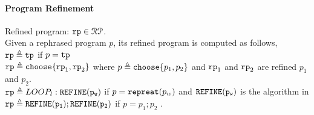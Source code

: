 \paragraph*{Program Refinement} 
Refined program:
$\mathtt{rp} \in \mathcal{RP}$.
\\
Given a rephrased program $p$, its refined program is computed as follows,
\\
$\mathtt{rp} \triangleq \mathtt{tp} $ if $p = \mathtt{tp}$\\
$\mathtt{rp} \triangleq \mathtt{choose}\{\mathtt{rp}_1, \mathtt{rp}_2 \}$ where $p \triangleq \mathtt{choose}\{p_1, p_2 \}$ and 
  $\mathtt{rp}_1$ and $\mathtt{rp}_2$ are refined $p_1$ and $p_2$. 
  \\
$\mathtt{rp} \triangleq LOOP_l : \mathtt{REFINE(p_w)}$  if $p = \mathtt{repreat}(p_w)$ and  $\mathtt{REFINE(p_w)}$ is the algorithm in \\
$\mathtt{rp} \triangleq \mathtt{REFINE(p_1)}; \mathtt{REFINE(p_2)}$  if $p = p_1; p_2$ 
\cite{sinn2017complexity}.
